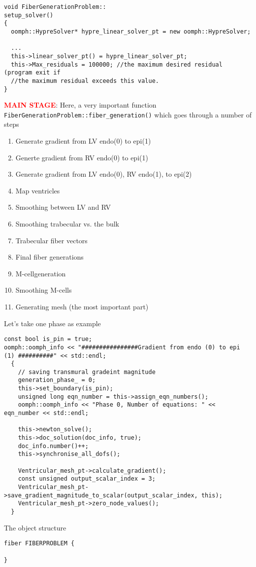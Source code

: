 \begin{lstlisting}
void FiberGenerationProblem::
setup_solver() 
{
  oomph::HypreSolver* hypre_linear_solver_pt = new oomph::HypreSolver;

  ...
  this->linear_solver_pt() = hypre_linear_solver_pt;
  this->Max_residuals = 100000; //the maximum desired residual (program exit if 
  //the maximum residual exceeds this value.
}
\end{lstlisting}


\textcolor{red}{\bf MAIN STAGE}: Here, a very important function
\verb!FiberGenerationProblem::fiber_generation()! which goes through a number of
steps
\begin{enumerate}
  \item Generate gradient from LV endo(0) to epi(1)

  \item Generte gradient from RV endo(0) to epi(1)
  
  \item Generate gradient from LV endo(0), RV endo(1), to epi(2)
  
  \item Map ventricles
  
  \item Smoothing between LV and RV 
  
  \item Smoothing trabecular vs. the bulk
  
  \item Trabecular fiber vectors
  
  \item Final fiber generations
  
  \item M-cellgeneration
  
  \item Smoothing M-cells
  
  \item Generating mesh (the most important part)
\end{enumerate}

Let's take one phase as example
\begin{verbatim}
const bool is_pin = true;
oomph::oomph_info << "################Gradient from endo (0) to epi (1) ##########" << std::endl;
  {
    // saving transmural gradeint magnitude
    generation_phase_ = 0;
    this->set_boundary(is_pin);
    unsigned long eqn_number = this->assign_eqn_numbers();
    oomph::oomph_info << "Phase 0, Number of equations: " << eqn_number << std::endl;

    this->newton_solve();
    this->doc_solution(doc_info, true);
    doc_info.number()++;
    this->synchronise_all_dofs();

    Ventricular_mesh_pt->calculate_gradient();
    const unsigned output_scalar_index = 3;
    Ventricular_mesh_pt->save_gradient_magnitude_to_scalar(output_scalar_index, this);
    Ventricular_mesh_pt->zero_node_values();
  } 
\end{verbatim}


The object structure
\begin{verbatim}
fiber FIBERPROBLEM {

}
\end{verbatim}
